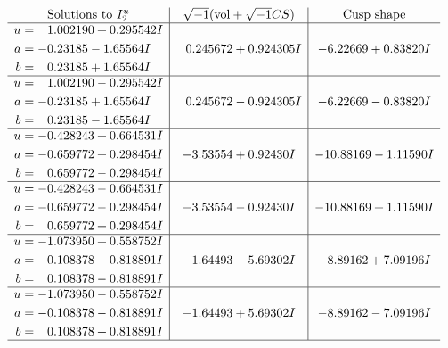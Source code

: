\documentclass[1p]{elsarticle_modified}
\theoremstyle{definition}
\newcommand{\I}{\sqrt{-1}}
\begin{document}
$$\begin{array}{c|c|c}  
\text{Solutions to }I^u_{2}& \I (\text{vol} + \sqrt{-1}CS) & \text{Cusp shape}\\
 \hline 
\begin{aligned}
u &= \phantom{-}1.002190 + 0.295542 I \\
a &= -0.23185 - 1.65564 I \\
b &= \phantom{-}0.23185 + 1.65564 I\end{aligned}
 & \phantom{-}0.245672 + 0.924305 I & -6.22669 + 0.83820 I \\ \hline\begin{aligned}
u &= \phantom{-}1.002190 - 0.295542 I \\
a &= -0.23185 + 1.65564 I \\
b &= \phantom{-}0.23185 - 1.65564 I\end{aligned}
 & \phantom{-}0.245672 - 0.924305 I & -6.22669 - 0.83820 I \\ \hline\begin{aligned}
u &= -0.428243 + 0.664531 I \\
a &= -0.659772 + 0.298454 I \\
b &= \phantom{-}0.659772 - 0.298454 I\end{aligned}
 & -3.53554 + 0.92430 I & -10.88169 - 1.11590 I \\ \hline\begin{aligned}
u &= -0.428243 - 0.664531 I \\
a &= -0.659772 - 0.298454 I \\
b &= \phantom{-}0.659772 + 0.298454 I\end{aligned}
 & -3.53554 - 0.92430 I & -10.88169 + 1.11590 I \\ \hline\begin{aligned}
u &= -1.073950 + 0.558752 I \\
a &= -0.108378 + 0.818891 I \\
b &= \phantom{-}0.108378 - 0.818891 I\end{aligned}
 & -1.64493 - 5.69302 I & -8.89162 + 7.09196 I \\ \hline\begin{aligned}
u &= -1.073950 - 0.558752 I \\
a &= -0.108378 - 0.818891 I \\
b &= \phantom{-}0.108378 + 0.818891 I\end{aligned}
 & -1.64493 + 5.69302 I & -8.89162 - 7.09196 I\\
 \hline 
 \end{array}$$\newpage\newpage\renewcommand{\arraystretch}{1}
\end{document}
